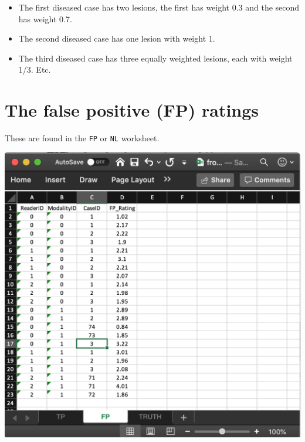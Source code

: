 \documentclass[
]{book}
\providecommand{\tightlist}{%
  \setlength{\itemsep}{0pt}\setlength{\parskip}{0pt}}
\begin{document}
\begin{itemize}
\tightlist
\item
  The first diseased case has two lesions, the first has weight 0.3 and the second has weight 0.7.
\item
  The second diseased case has one lesion with weight 1.
\item
  The third diseased case has three equally weighted lesions, each with weight 1/3. Etc.
\end{itemize}

\hypertarget{quick-start-froc-data-fp}{%
\section{The false positive (FP) ratings}\label{quick-start-froc-data-fp}}

These are found in the \texttt{FP} or \texttt{NL} worksheet.

\includegraphics[width=1\textwidth,height=\textheight]{images/quick-start/frocCrNL.png}
\end{document}
